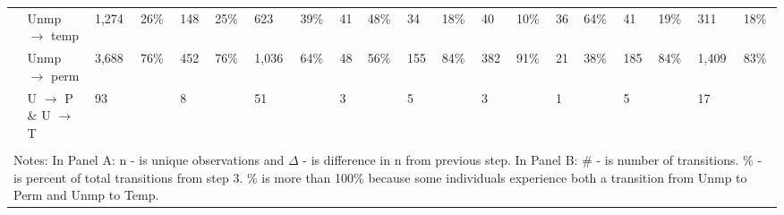 \begin{tabular}{l>{\raggedright\arraybackslash}p{2in}llllllllllllllllll}
 & Unmp $\rightarrow$ temp & 1,274 & 26\% & 148 & 25\% & 623 & 39\% & 41 & 48\% & 34 & 18\% & 40 & 10\% & 36 & 64\% & 41 & 19\% & 311 & 18\% \\ 
   & Unmp $\rightarrow$ perm & 3,688 & 76\% & 452 & 76\% & 1,036 & 64\% & 48 & 56\% & 155 & 84\% & 382 & 91\% & 21 & 38\% & 185 & 84\% & 1,409 & 83\% \\ 
   & U $\rightarrow$ P \& U $\rightarrow$ T & 93 &  & 8 &  & 51 &  & 3 &  & 5 &  & 3 &  & 1 &  & 5 &  & 17 &  \\ 
   \bottomrule \\[-1.8ex] \multicolumn{20}{p{12in}}{Notes: 
               In Panel A: n - is unique observations and $\Delta$ - is difference in n from previous step.  
               In Panel B:                
               \# - is number of transitions.  
               \% - is percent of total transitions from step 3. 
               \% is more than 100\% because some individuals experience both a transition from Unmp to Perm and Unmp to Temp.
               } 
\end{tabular}
